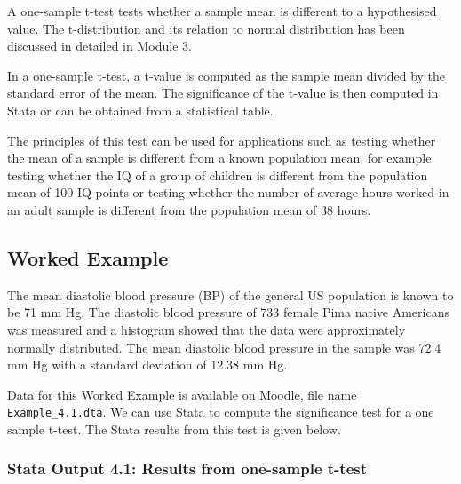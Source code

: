 \documentclass[
]{memoir}
\begin{document}
A one-sample t-test tests whether a sample mean is different to a hypothesised value. The t-distribution and its relation to normal distribution has been discussed in detailed in Module 3.

In a one-sample t-test, a t-value is computed as the sample mean divided by the standard error of the mean. The significance of the t-value is then computed in Stata or can be obtained from a statistical table.

The principles of this test can be used for applications such as testing whether the mean of a sample is different from a known population mean, for example testing whether the IQ of a group of children is different from the population mean of 100 IQ points or testing whether the number of average hours worked in an adult sample is different from the population mean of 38 hours.

\hypertarget{worked-example-4}{%
\subsection{Worked Example}\label{worked-example-4}}

The mean diastolic blood pressure (BP) of the general US population is known to be 71 mm Hg. The diastolic blood pressure of 733 female Pima native Americans was measured and a histogram showed that the data were approximately normally distributed. The mean diastolic blood pressure in the sample was 72.4 mm Hg with a standard deviation of 12.38 mm Hg.

Data for this Worked Example is available on Moodle, file name \texttt{Example\_4.1.dta}. We can use Stata to compute the significance test for a one sample t-test. The Stata results from this test is given below.

\hypertarget{stata-output-4.1-results-from-one-sample-t-test}{%
\subsubsection*{Stata Output 4.1: Results from one-sample t-test}\label{stata-output-4.1-results-from-one-sample-t-test}}
\end{document}
